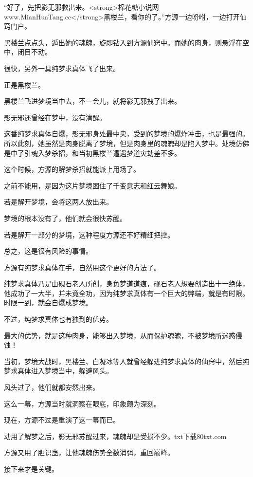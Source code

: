 
\begin{this_body}

“好了，先把影无邪救出来。<strong>棉花糖小说网www.MianHuaTang.cc</strong>黑楼兰，看你的了。”方源一边吩咐，一边打开仙窍门户。

黑楼兰点点头，遁出她的魂魄，旋即钻入到方源仙窍中。而她的肉身，则悬浮在空中，闭目不动。

很快，另外一具纯梦求真体飞了出来。

正是黑楼兰。

黑楼兰飞进梦境当中去，不一会儿，就将影无邪拽了出来。

影无邪还曾经在梦中，没有清醒。

这番纯梦求真体自爆，影无邪身处最中央，受到的梦境的爆炸冲击，也是最强的。所以此刻，她虽然是肉身脱离了梦境，但是肉身里的魂魄却是陷入梦中。处境仿佛是中了引魂入梦杀招，和当初黑楼兰遭遇梦道灾劫差不多。

这个时候，方源的解梦杀招就能派上用场了。

之前不能用，是因为这片梦境困住了千变意志和红云舞娘。

若是解开梦境，会将这两人放出来。

梦境的根本没有了，他们就会很快苏醒。

若是解开一部分的梦境，这种程度方源还不好精细把控。

总之，这是很有风险的事情。

方源有纯梦求真体在手，自然用这个更好的方法了。

纯梦求真体乃是由砚石老人所创，身负梦道道痕，砚石老人想要创造出十一绝体，他成功了一大半，并未竟全功，因为纯梦求真体有一个巨大的弊端，就是有时限。时限一到，就会自爆成梦境。

不过，纯梦求真体也有独到的优势。

最大的优势，就是这种肉身，能够出入梦境，从而保护魂魄，不被梦境所迷惑侵蚀！

当初，梦境大战时，黑楼兰、白凝冰等人就曾经躲进纯梦求真体的仙窍中，然后纯梦求真体进入梦境当中，躲避风头。

风头过了，他们就都安然出来。

这么一幕，方源当时就洞察在眼底，印象颇为深刻。

现在，方源不过是重演了这一幕而已。

动用了解梦之后，影无邪苏醒过来，魂魄却是受损不少。txt下载80txt.com

方源又用了胆识蛊，让他魂魄伤势全数消弭，重回巅峰。

接下来才是关键。


\end{this_body}
